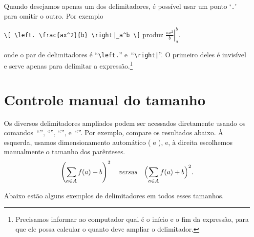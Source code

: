 \documentclass[article,openany]{memoir}
\newcommand*{\astt}[1]{%
  `\thinspace\texttt{#1}\thinspace'}
\newenvironment{exemplo}{\begin{center}}{\end{center}}
\begin{document}
Quando desejamos apenas um dos delimitadores, é possível usar um ponto
\astt{.} para omitir o outro. Por exemplo
\begin{exemplo}
\verb/\[ \left. \frac{ax^2}{b} \right|_a^b \]/
produz
\(\displaystyle
\left. \frac{ax^2}{b} \right|_a^b \).
\end{exemplo}
onde o par de delimitadores é ``\verb/\left./'' e~``\verb/\right|/''.
O primeiro deles é invisível e serve apenas para delimitar a
expressão.\footnote{Precisamos informar ao computador qual é o início
  e o fim da expressão, para que ele possa calcular o quanto deve
  ampliar o delimitador.}

\chapter{Controle manual do tamanho}

Os diversos delimitadores ampliados podem ser acessados diretamente
usando os comandos~``'', ``'', ``'',
e~``''. Por exemplo, compare os resultados abaixo. À
esquerda, usamos dimensionamento automático ( e ),
e, à direita escolhemos manualmente o tamanho dos parênteses.
\[
\left(\sum_{a\in A} f(a) + b\right)^2 \quad\text{\emph{versus}}\quad \Bigl(\sum_{a\in A} f(a) + b \Bigl)^2.
\]

Abaixo estão alguns exemplos de delimitadores em todos esses tamanhos.
\end{document}

